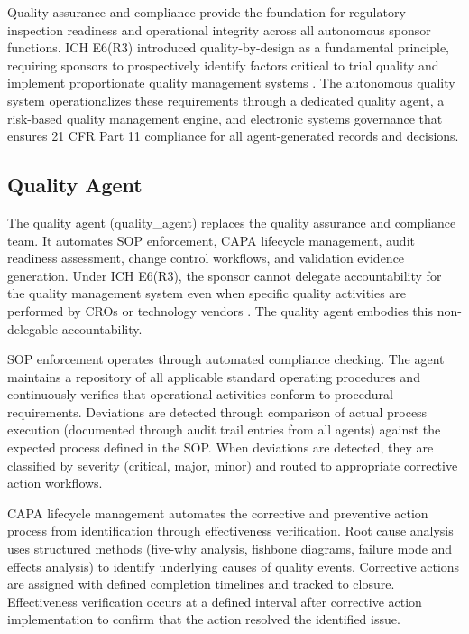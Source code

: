 
Quality assurance and compliance provide the foundation for regulatory inspection readiness
and operational integrity across all autonomous sponsor functions. ICH E6(R3) introduced
quality-by-design as a fundamental principle, requiring sponsors to prospectively identify
factors critical to trial quality and implement proportionate quality management systems
\cite{ich-e6r3}. The autonomous quality system operationalizes these requirements through
a dedicated quality agent, a risk-based quality management engine, and electronic systems
governance that ensures 21 CFR Part 11 compliance \cite{cfr-part-11} for all agent-generated
records and decisions.

\subsection{Quality Agent}

The quality agent (quality\_agent) replaces the quality assurance and compliance team. It
automates SOP enforcement, CAPA lifecycle management, audit readiness assessment, change
control workflows, and validation evidence generation. Under ICH E6(R3), the sponsor cannot
delegate accountability for the quality management system even when specific quality
activities are performed by CROs or technology vendors \cite{ich-e6r3}. The quality agent
embodies this non-delegable accountability.

SOP enforcement operates through automated compliance checking. The agent maintains a
repository of all applicable standard operating procedures and continuously verifies that
operational activities conform to procedural requirements. Deviations are detected
through comparison of actual process execution (documented through audit trail entries
from all agents) against the expected process defined in the SOP. When deviations are
detected, they are classified by severity (critical, major, minor) and routed to
appropriate corrective action workflows.

CAPA lifecycle management automates the corrective and preventive action process from
identification through effectiveness verification. Root cause analysis uses structured
methods (five-why analysis, fishbone diagrams, failure mode and effects analysis) to
identify underlying causes of quality events. Corrective actions are assigned with
defined completion timelines and tracked to closure. Effectiveness verification occurs
at a defined interval after corrective action implementation to confirm that the action
resolved the identified issue.

